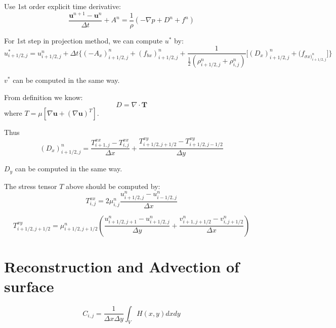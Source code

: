 \documentclass[11pt]{article}
\begin{document}
Use 1st order explicit time derivative:
\begin{equation}
    \frac{\bm{u}^{n+1}-\bm{u}^{n}}{\Delta t} + A^{n} = \frac{1}{\rho} (-\nabla p + D^{n} + f^{n})
    \label{}
\end{equation}

For 1st step in projection method, we can compute $u^{*}$ by:
\begin{equation}
    u^{*}_{i+1/2,j} = u^{n}_{i+1/2,j} + \Delta t \Big\{ (-A_{x})^{n}_{i+1/2,j} + (f_{bx})^{n}_{i+1/2,j} + \frac{1}{\frac{1}{2}(\rho ^{n}_{i+1/2,j}+\rho ^{n}_{i,j})} \Big[ (D_x)^{n}_{i+1/2,j} + (f_{\sigma x)^{n}_{i+1/2,j}} \Big] \Big\}
    \label{}
\end{equation}

$v^{*}$ can be computed in the same way.

From definition we know:
\begin{equation}
    D = \nabla \cdot \bm{T}
    \label{}
\end{equation}
where $T = \mu [ \nabla \bm{u} +(\nabla \bm{u})^T]$.

Thus
\begin{equation}
    (D_x)^{n}_{i+1/2,j} = \frac{T^{xx}_{i+1,j}-T^{xx}_{i,j}}{\Delta x} + \frac{T^{xy}_{i+1/2,j+1/2}-T^{xy}_{i+1/2,j-1/2}}{\Delta y}
    \label{}
\end{equation}

$D_y$ can be computed in the same way.

The stress tensor $T$ above  should be computed by:
\begin{equation}
    T^{xx}_{i,j} =  2 \mu ^{n}_{i,j} \frac{u^{n}_{i+1/2,j}- u^{n}_{i-1/2,j}}{\Delta x}
    \label{}
\end{equation}

\begin{equation}
    T^{xy}_{i+1/2,j+1/2} = \mu ^{n}_{i+1/2,j+1/2} (\frac{u^{n}_{i+1/2,j+1}-u^{n}_{i+1/2,j}}{\Delta y} + \frac{v^{n}_{i+1,j+1/2}-v^{n}_{i,j+1/2}}{\Delta x})
    \label{}
\end{equation}

\section{Reconstruction and Advection of surface}

\begin{equation}
    C_{i,j} = \frac{1}{\Delta x \Delta y} \int_{V}^{} H(x,y) dx dy
    \label{}
\end{equation}
\end{document}
